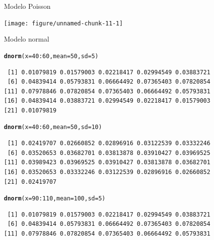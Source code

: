 \documentclass[10pt]{beamer}\usepackage[]{graphicx}\usepackage[]{color}
\makeatletter
\newcommand{\hlnum}[1]{\textcolor[rgb]{0.686,0.059,0.569}{#1}}%
\newcommand{\hlopt}[1]{\textcolor[rgb]{0,0,0}{#1}}%
\newcommand{\hlstd}[1]{\textcolor[rgb]{0.345,0.345,0.345}{#1}}%
\newcommand{\hlkwc}[1]{\textcolor[rgb]{0.333,0.667,0.333}{#1}}%
\newcommand{\hlkwd}[1]{\textcolor[rgb]{0.737,0.353,0.396}{\textbf{#1}}}%
\newenvironment{kframe}{%
 \def\at@end@of@kframe{}%
 \ifinner\ifhmode%
  \def\at@end@of@kframe{\end{minipage}}%
  \begin{minipage}{\columnwidth}%
 \fi\fi%
 \def\FrameCommand##1{\hskip\@totalleftmargin \hskip-\fboxsep
 \colorbox{shadecolor}{##1}\hskip-\fboxsep
     \hskip-\linewidth \hskip-\@totalleftmargin \hskip\columnwidth}%
 \MakeFramed {\advance\hsize-\width
   \@totalleftmargin\z@ \linewidth\hsize
   \@setminipage}}%
 {\par\unskip\endMakeFramed%
 \at@end@of@kframe}
\newenvironment{knitrout}{}{} %
\theoremstyle{definition}
\makeatother
\begin{document}
\begin{frame}[fragile]{Modelo Poisson}
\begin{knitrout}\small
{}\color{fgcolor}

{\centering \texttt{[image: figure/unnamed-chunk-11-1]} 

}



\end{knitrout}
\end{frame}

\begin{frame}[fragile]{Modelo normal}
\begin{knitrout}\footnotesize
{}\color{fgcolor}\begin{kframe}
\begin{alltt}
\hlkwd{dnorm}\hlstd{(}\hlkwc{x} \hlstd{=} \hlnum{40}\hlopt{:}\hlnum{60}\hlstd{,} \hlkwc{mean} \hlstd{=} \hlnum{50}\hlstd{,} \hlkwc{sd} \hlstd{=} \hlnum{5}\hlstd{)}
\end{alltt}
\begin{verbatim}
 [1] 0.01079819 0.01579003 0.02218417 0.02994549 0.03883721
 [6] 0.04839414 0.05793831 0.06664492 0.07365403 0.07820854
[11] 0.07978846 0.07820854 0.07365403 0.06664492 0.05793831
[16] 0.04839414 0.03883721 0.02994549 0.02218417 0.01579003
[21] 0.01079819
\end{verbatim}
\begin{alltt}
\hlkwd{dnorm}\hlstd{(}\hlkwc{x} \hlstd{=} \hlnum{40}\hlopt{:}\hlnum{60}\hlstd{,} \hlkwc{mean} \hlstd{=} \hlnum{50}\hlstd{,} \hlkwc{sd} \hlstd{=} \hlnum{10}\hlstd{)}
\end{alltt}
\begin{verbatim}
 [1] 0.02419707 0.02660852 0.02896916 0.03122539 0.03332246
 [6] 0.03520653 0.03682701 0.03813878 0.03910427 0.03969525
[11] 0.03989423 0.03969525 0.03910427 0.03813878 0.03682701
[16] 0.03520653 0.03332246 0.03122539 0.02896916 0.02660852
[21] 0.02419707
\end{verbatim}
\begin{alltt}
\hlkwd{dnorm}\hlstd{(}\hlkwc{x} \hlstd{=} \hlnum{90}\hlopt{:}\hlnum{110}\hlstd{,} \hlkwc{mean} \hlstd{=} \hlnum{100}\hlstd{,} \hlkwc{sd} \hlstd{=} \hlnum{5}\hlstd{)}
\end{alltt}
\begin{verbatim}
 [1] 0.01079819 0.01579003 0.02218417 0.02994549 0.03883721
 [6] 0.04839414 0.05793831 0.06664492 0.07365403 0.07820854
[11] 0.07978846 0.07820854 0.07365403 0.06664492 0.05793831

\end{verbatim}
\end{kframe}
\end{knitrout}
\end{frame}
\end{document}
